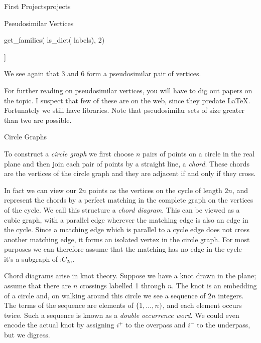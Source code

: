 \begin{chap}{First Projects}{projects}
\begin{sect}{Pseudosimilar Vertices}
\begin{sagecode}
\begin{sageinput}
get_families( ls_dict( labels), 2)
\end{sageinput}
\begin{sageoutput}
[[3, 6]]
\end{sageoutput}
\end{sagecode}
%
\begin{para}
We see again that 3 and 6 form a pseudosimilar pair of vertices.
\end{para}
%
\begin{para}
For further reading on pseudosimilar vertices, you will have to dig out papers
on the topic.  I suspect that few of these are on the web, since they
predate \LaTeX{}.  Fortunately we still have libraries.  Note that pseudosimilar
sets of size greater than two are possible.
\end{para}
%
\end{sect}
%
\begin{sect}{Circle Graphs}
%
\begin{para}
To construct a \textsl{circle graph} we first choose $n$ pairs of points on a 
circle in the real plane and then join each pair of points by a straight line,
a \textsl{chord}. These chords are the vertices of the circle graph and they
are adjacent if and only if they cross.
\end{para}
%
\begin{para}
In fact we can view our $2n$ points as the vertices on the cycle of length
$2n$, and represent the chords by a perfect matching in the complete graph
on the vertices of the cycle. We call this structure a \textsl{chord diagram}.
This can be viewed as a cubic graph, with a parallel edge wherever the matching
edge is also an edge in the cycle.
Since a matching edge which is parallel to a cycle edge does not cross
another matching edge, it forms an isolated vertex in the circle
graph. For most purposes we can therefore assume that the matching has
no edge in the cycle---it's a subgraph of $\comp{C_{2n}}$.
\end{para}
%
\begin{para}
Chord diagrams arise in knot theory. Suppose we have a knot drawn in the
plane; assume that there are $n$ crossings labelled 1 through $n$. The knot is 
an embedding of a circle and, on walking around this circle we see a sequence
of $2n$ integers. The terms of the sequence are elements of $\{1,\ldots,n\}$,
and each element occurs twice. Such a sequence is known as a 
\textsl{double occurrence word}. We could even encode the actual knot by
assigning $i^+$ to the overpass and $i^-$ to the underpass, but we digress.

\end{para}
\end{sect}
\end{chap}
